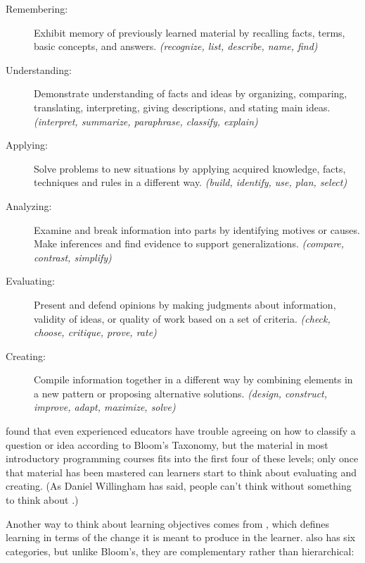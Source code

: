 \begin{description}

\item[Remembering:] Exhibit memory of previously learned material by
  recalling facts, terms, basic concepts, and answers.
  \emph{(recognize, list, describe, name, find)}

\item[Understanding:] Demonstrate understanding of facts and ideas by
  organizing, comparing, translating, interpreting, giving
  descriptions, and stating main ideas.
  \emph{(interpret, summarize, paraphrase, classify, explain)}

\item[Applying:] Solve problems to new situations by applying acquired
  knowledge, facts, techniques and rules in a different way.
  \emph{(build, identify, use, plan, select)}

\item[Analyzing:] Examine and break information into parts by
  identifying motives or causes.  Make inferences and find evidence to
  support generalizations.
  \emph{(compare, contrast, simplify)}

\item[Evaluating:] Present and defend opinions by making judgments
  about information, validity of ideas, or quality of work based on a
  set of criteria.
  \emph{(check, choose, critique, prove, rate)}

\item[Creating:] Compile information together in a different way by
  combining elements in a new pattern or proposing alternative
  solutions.
  \emph{(design, construct, improve, adapt, maximize, solve)}

\end{description}

\cite{Masa2018} found that even experienced educators have trouble
agreeing on how to classify a question or idea according to Bloom's
Taxonomy, but the material in most introductory programming courses
fits into the first four of these levels; only once that material has
been mastered can learners start to think about evaluating and
creating.  (As Daniel Willingham has said, people can't think without
something to think about \cite{Will2010}.)

Another way to think about learning objectives comes from
\cite{Fink2013}, which defines learning in terms of the change it is
meant to produce in the learner.   also has six categories, but unlike Bloom's, they are
complementary rather than hierarchical:

